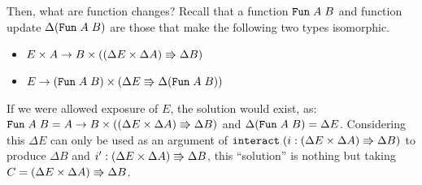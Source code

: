 \documentclass{article}
\theoremstyle{definition}
\begin{document}

Then, what are function changes? Recall that a function $\texttt{Fun} \; A \; B$ and function update $\Delta (\texttt{Fun} \; A \; B)$ are those that make the following two types isomorphic.
\begin{itemize}
 \item \( E \times A \to B \times ((\Delta E \times \Delta A) \Rrightarrow \Delta B) \)
 \item \( E \to (\texttt{Fun} \; A \; B) \times (\Delta E \Rrightarrow \Delta (\texttt{Fun} \; A \; B)) \)
\end{itemize}
If we were allowed exposure of $E$, the solution would exist, as: 
$\texttt{Fun} \; A \; B = A \to B \times ((\Delta E \times \Delta A) \Rrightarrow \Delta B)$
and 
$\Delta (\texttt{Fun} \; A \; B) = \Delta E$. 
Considering this $\Delta E$ can only be used as an argument of $\texttt{interact} \; (i : (\Delta E \times \Delta A) \Rrightarrow \Delta B)$ to produce $\Delta B$ and $i' : (\Delta E \times \Delta A) \Rrightarrow \Delta B$, 
this ``solution'' is nothing but taking $C = (\Delta E \times \Delta A) \Rrightarrow \Delta B$. 
\end{document}

